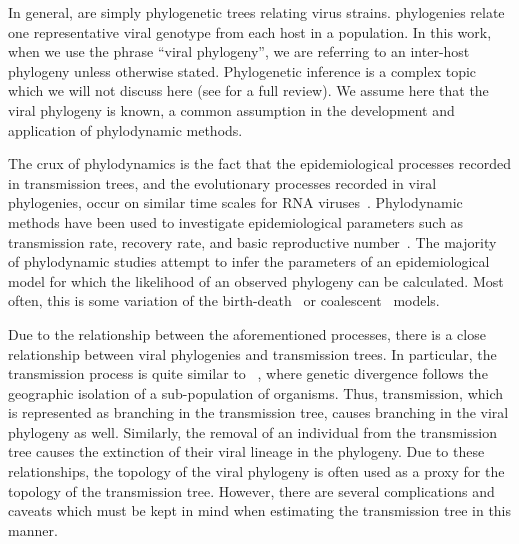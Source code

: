 In general,  are simply phylogenetic trees relating
virus strains.  phylogenies relate one representative viral
genotype from each host in a population. In this work, when we use the phrase
``viral phylogeny'', we are referring to an inter-host phylogeny unless
otherwise stated. Phylogenetic inference is a complex topic which we will not
discuss here (see \eg \autocite{nei2000molecular} for a full review). We assume
here that the viral phylogeny is known, a common assumption in the development
and application of phylodynamic methods.

The crux of phylodynamics is the fact that the epidemiological processes
recorded in transmission trees, and the evolutionary processes recorded in
viral phylogenies, occur on similar time scales for RNA
viruses~\autocite{drummond2003measurably}. Phylodynamic methods have been used
to investigate epidemiological parameters such as transmission rate, recovery
rate, and basic reproductive number~\autocite{pybus2009evolutionary,
volz2013viral}. The majority of phylodynamic studies attempt to infer the
parameters of an epidemiological model for which the likelihood of an observed
phylogeny can be calculated. Most often, this is some variation of the
birth-death~\autocite{kendall1948generalized, stadler2012estimating} or
coalescent~\autocite{kingman1982coalescent, volz2012complex} models.

Due to the relationship between the aforementioned processes, there is a close
relationship between viral phylogenies and transmission trees. In particular,
the transmission process is quite similar to ~\autocite{coyne2004speciation}, where genetic divergence follows
the geographic isolation of a sub-population of organisms. Thus, transmission,
which is represented as branching in the transmission tree, causes branching in
the viral phylogeny as well. Similarly, the removal of an individual from the
transmission tree causes the extinction of their viral lineage in the
phylogeny. Due to these relationships, the topology of the viral phylogeny is
often used as a proxy for the topology of the transmission tree. However, there
are several complications and caveats which must be kept in mind when
estimating the transmission tree in this manner.

